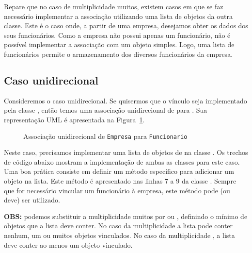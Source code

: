 Repare que no caso de multiplicidade muitos, existem casos em que se faz necessário implementar a associação utilizando uma lista de objetos da outra classe. Este é o caso onde, a partir de uma empresa, desejamos obter os dados dos seus funcionários. Como a empresa não possui apenas um funcionário, não é possível implementar a associação com um objeto simples. Logo, uma lista de funcionários permite o armazenamento dos diversos funcionários da empresa.

\subsection{Caso unidirecional}

Consideremos o caso unidirecional. Se quisermos que o vínculo seja implementado pela classe , então temos uma associação unidirecional de  para . Sua representação UML é apresentada na Figura~\ref{fig:associacao-muitos-uni-empresa}.

\begin{figure}[h]
	\centering
	
	
	\caption{Associação unidirecional de \texttt{Empresa} para \texttt{Funcionario}}
	\label{fig:associacao-muitos-uni-empresa}
\end{figure}

Neste caso, precisamos implementar uma lista de objetos de  na classe . Os trechos de código abaixo mostram a implementação de ambas as classes para este caso. Uma boa prática consiste em definir um método específico para adicionar um objeto na lista. Este método é apresentado nas linhas 7 a 9 da classe . Sempre que for necessário vincular um funcionário à empresa, este método pode (ou deve) ser utilizado.

\textbf{OBS:} podemos substituir a multiplicidade muitos por  ou , definindo o mínimo de objetos que a lista deve conter. No caso da multiplicidade  a lista pode conter nenhum, um ou muitos objetos vinculados. No caso da multiplicidade , a lista deve conter ao menos um objeto vinculado.

